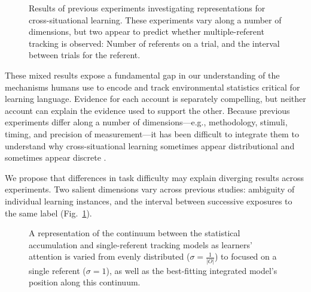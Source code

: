\documentclass{pnastwo}
\begin{document}
\begin{article}
 \begin{figure}[t]
	\caption{\label{fig:mrefs} Results of previous experiments investigating representations for cross-situational learning. These experiments vary along a number of dimensions, but two appear to predict whether multiple-referent tracking is observed: Number of referents on a trial, and the interval between trials for the referent.}
\end{figure}

These mixed results expose a fundamental gap in our understanding of the mechanisms humans use to encode and track environmental statistics critical for learning language. Evidence for each account is separately compelling, but neither account can explain the evidence used to support the other. Because previous experiments differ along a number of dimensions---e.g., methodology, stimuli, timing, and precision of measurement---it has been difficult to integrate them to understand why cross-situational learning sometimes appear distributional and sometimes appear discrete \citep[see][for a review]{Yurovsky2014}. 

We propose that differences in task difficulty may explain diverging results across experiments. Two salient dimensions vary across previous studies: ambiguity of individual learning instances, and the interval between successive exposures to the same label (Fig.~\ref{fig:mrefs}). 

 \begin{figure}[h]
	\caption{\label{fig:models} A representation of the continuum between the statistical accumulation and single-referent tracking models as learners' attention is varied from evenly distributed ($\sigma=\frac{1}{|O|}$) to focused on a single referent ($\sigma=1$), as well as the best-fitting integrated model's position along this continuum.}
\end{figure}


\end{article}
\end{document}
